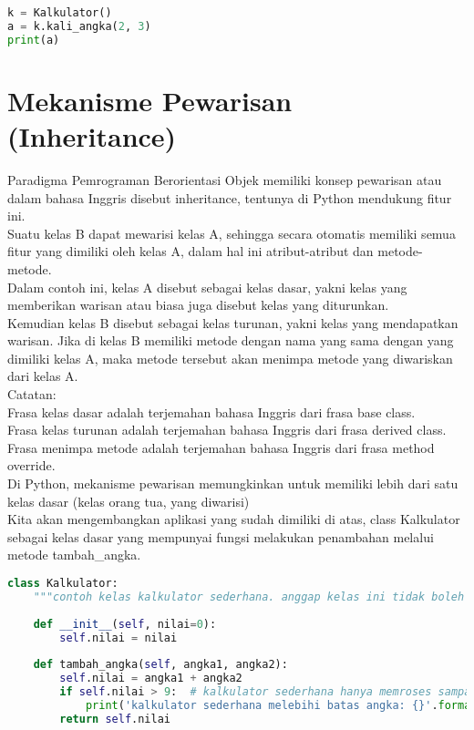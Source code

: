 \begin{lstlisting}[language=Python]
k = Kalkulator()
a = k.kali_angka(2, 3)
print(a)
\end{lstlisting}

\section{Mekanisme Pewarisan (Inheritance)}

Paradigma Pemrograman Berorientasi Objek memiliki konsep pewarisan atau dalam bahasa Inggris disebut inheritance, tentunya di Python mendukung fitur ini.\\

Suatu kelas B dapat mewarisi kelas A, sehingga secara otomatis memiliki semua fitur yang dimiliki oleh kelas A, dalam hal ini atribut-atribut dan metode-metode.\\

Dalam contoh ini, kelas A disebut sebagai kelas dasar, yakni kelas yang memberikan warisan atau biasa juga disebut kelas yang diturunkan.\\

Kemudian kelas B disebut sebagai kelas turunan, yakni kelas yang mendapatkan warisan.
Jika di kelas B memiliki metode dengan nama yang sama dengan yang dimiliki kelas A, maka metode tersebut akan menimpa metode yang diwariskan dari kelas A.\\

Catatan:\\

Frasa kelas dasar adalah terjemahan bahasa Inggris dari frasa base class.\\

Frasa kelas turunan adalah terjemahan bahasa Inggris dari frasa derived class.\\

Frasa menimpa metode adalah terjemahan bahasa Inggris dari frasa method override.\\

Di Python, mekanisme pewarisan memungkinkan untuk memiliki lebih dari satu kelas dasar (kelas orang tua, yang diwarisi)\\

Kita akan mengembangkan aplikasi yang sudah dimiliki di atas, class Kalkulator sebagai kelas dasar yang mempunyai fungsi melakukan penambahan melalui metode tambah\_angka.\\

\begin{lstlisting}[language=Python]
class Kalkulator:
    """contoh kelas kalkulator sederhana. anggap kelas ini tidak boleh diubah!"""
 
    def __init__(self, nilai=0):
        self.nilai = nilai
 
    def tambah_angka(self, angka1, angka2):
        self.nilai = angka1 + angka2
        if self.nilai > 9:  # kalkulator sederhana hanya memroses sampai 9
            print('kalkulator sederhana melebihi batas angka: {}'.format(self.nilai))
        return self.nilai
\end{lstlisting}

